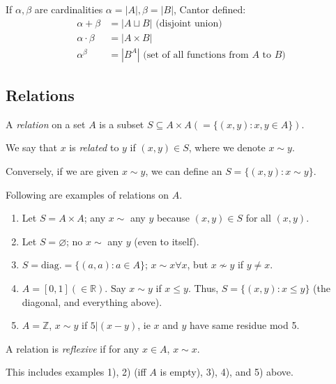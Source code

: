 \documentclass[12pt,oneside]{article}
\begin{document}
\begin{definition}
If $\alpha, \beta$ are cardinalities $\alpha = |A|, \beta = |B|$, Cantor defined:
\begin{align*}
  \alpha + \beta &= |A \sqcup B| \text{ (disjoint union)}\\ 
  \alpha \cdot \beta &= |A \times B|\\
  \alpha^\beta &= |B^A| \text{ (set of all functions from $A$ to $B$)}  
\end{align*}
\end{definition}

\subsection{Relations}

\begin{definition}[Relation]
  A \emph{relation} on a set $A$ is a subset $S \subseteq A \times A (= \{(x,y) : x, y \in A\})$.

  We say that $x$ is \emph{related} to $y$ if $(x,y) \in S$, where we denote $x \sim y$. 

  Conversely, if we are given $x \sim y$, we can define an $S = \{(x,y): x \sim y\}$.
\end{definition}

\begin{example}
  Following are examples of relations on $A$.
  \begin{enumerate}[label=\arabic*)]
    \item Let $S = A \times A$; any $x \sim$ any $y$ because $(x,y) \in S$ for all $(x,y)$.
    \item Let $S = \varnothing$; no $x \sim$ any $y$ (even to itself).
    \item $S = \text{diag.} = \{(a,a) : a \in A\}$; $x \sim x \forall x$, but $x \nsim y$ if $y \neq x$.
    \item $A = [0,1] (\in \mathbb{R})$. Say $x \sim y$ if $x \leq y$. Thus, $S = \{(x,y) : x \leq y\}$ (the diagonal, and everything above).
    \item $A = \mathbb{Z}$, $x \sim y$ if $5 | (x-y)$, ie $x$ and $y$ have same residue mod 5.\footnotemark
  \end{enumerate}
\end{example}

\begin{definition}[Reflexive]
  A relation is \emph{reflexive} if for any $x \in A$, $x \sim x$. 
  
  This includes examples 1), 2) (iff $A$ is empty), 3), 4), and 5) above.
\end{definition}
\end{document}
